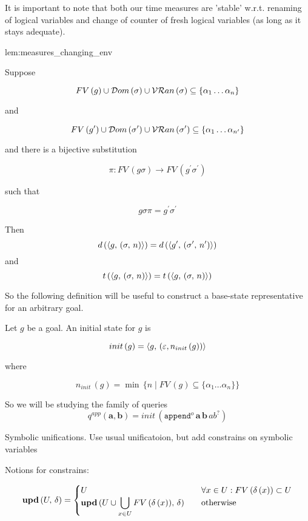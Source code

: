 It is important to note that both our time measures are 'stable' w.r.t. renaming of logical variables and change of counter of fresh logical variables (as long as it stays adequate).

\begin{replemma}{lem:measures_changing_env}

  Suppose

  \[ FV\,(g) \cup \mathcal{D}om\,(\sigma) \cup \mathcal{VR}an\,(\sigma) \subseteq \{ \alpha_1\dots\alpha_n \} \]
  
  and

  \[ FV\,(g^\prime) \cup \mathcal{D}om\,(\sigma^\prime) \cup \mathcal{VR}an\,(\sigma^\prime) \subseteq \{ \alpha_1\dots \alpha_{n^\prime} \} \]

  and there is a bijective substitution

  \[\pi \colon FV\,(g \sigma) \to FV\,(g^\prime \sigma^\prime)\]

  such that

  \[ g \sigma \pi = g^\prime \sigma^\prime \]

  Then \[ d\,(\langle g ,\, (\sigma ,\, n) \rangle) = d\,(\langle g^\prime ,\, (\sigma^\prime ,\, n^\prime) \rangle) \] and \[ t\,(\langle g ,\, (\sigma ,\, n) \rangle) = t\,(\langle g ,\, (\sigma ,\, n) \rangle) \] 

\end{replemma}

So the following definition will be useful to construct a base-state representative for an arbitrary goal.

\begin{definition} Let $g$ be a goal. An initial state for $g$ is

  \[
   init\,(g)=\langle g ,\, (\varepsilon, n_{init}\,(g)) \rangle
  \]

  where
  
  \[ n_{init}\,(g) = \min\, \{ n \mid FV\,(g) \subseteq \{ \alpha_1\dots\alpha_n \} \} \]
\end{definition}

So we will be studying the family of queries \[ q^{app}(\mathbf{a}, \mathbf{b}) = init\,(\texttt{append$^o$} \, \mathbf{a} \, \mathbf{b} \, ab^?) \]

\colorbox{blue!20}{\parbox{\textwidth}{Symbolic unifications. Use usual unificatoion, but add constrains on symbolic variables}}

Notions for constrains:

\[
\mbox{\textbf{upd}}\,(U,\, \delta) = \begin{cases}
                           U & \quad\forall x \in U : FV\,(\delta\,(x)) \subset U \\
                           \mbox{\textbf{upd}}\,(U \cup \displaystyle\bigcup\limits_{x \in U} FV\,(\delta\,(x)),\, \delta) & \quad\mbox{otherwise}
                          \end{cases}
\]

